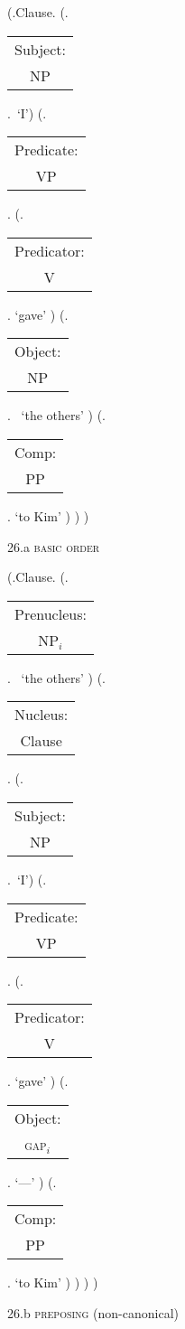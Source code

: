 \documentclass[12pt,letterpaper]{article}
\begin{document}
\begin{figure}
	\begin{center}
		\begin{parsetree}
			(.Clause.
			(.\begin{tabular}{c}Subject:\\NP\end{tabular}.~`I')
			(.\begin{tabular}{c}Predicate:\\VP\end{tabular}.
			(.\begin{tabular}{c}Predicator:\\V\end{tabular}. `gave' )
			(.\begin{tabular}{c}Object:\\NP\end{tabular}.~ `the others' )
			(.\begin{tabular}{c}Comp:\\PP\end{tabular}. `to Kim' )
			)
			)
			
			\hfill \break\hfill \break
		\end{parsetree}
		26.a \textsc{basic order}
	\end{center}
\end{figure}

\begin{figure}
	\begin{center}
		\begin{parsetree}
			(.Clause.
			(.\begin{tabular}{c}Prenucleus:\\NP$_i$\end{tabular}.~ `the others' )
			(.\begin{tabular}{c}Nucleus:\\Clause\end{tabular}.
			(.\begin{tabular}{c}Subject:\\NP\end{tabular}.~`I')
			(.\begin{tabular}{c}Predicate:\\VP\end{tabular}.
			(.\begin{tabular}{c}Predicator:\\V\end{tabular}. `gave' )
			(.\begin{tabular}{c}Object:\\\textsc{gap}$_i$\end{tabular}. `---' )
			(.\begin{tabular}{c}Comp:\\PP\end{tabular}. `to Kim' )
			)
			)
			)
			
			\hfill \break\hfill \break
		\end{parsetree}
		26.b \textsc{preposing} (non-canonical)
	\end{center}
\end{figure}
\clearpage
\end{document}
